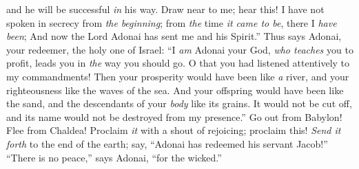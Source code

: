 \begin{biblechapter}
and he will be successful \textit{in} his way.
\verse Draw near to me; hear this! I have not spoken in secrecy from \textit{the} \textit{beginning}; 
from \textit{the} time \textit{it came to be}, there I \textit{have been}; 
And now the Lord Adonai has sent me and his Spirit.”
\verse Thus says Adonai, your redeemer, the holy one of Israel: “I \textit{am} Adonai your God, \textit{who teaches} you to profit, 
leads you in \textit{the} way you should go.
\verse O that you had listened attentively to my commandments!
\verse Then your prosperity would have been like \textit{a} river, 
and your righteousness like the waves of the sea.
\verse And your offspring would have been like the sand, 
and the descendants of your \textit{body} like its grains. 
It would not be cut off, 
and its name would not be destroyed from my presence.”
\verse Go out from Babylon! 
Flee from Chaldea! 
Proclaim \textit{it} with a shout of rejoicing; proclaim this! 
\textit{Send it forth} to the end of the earth; 
say, “Adonai has redeemed his servant Jacob!”
\verse “There is no peace,” says Adonai, “for the wicked.”
\end{biblechapter}

